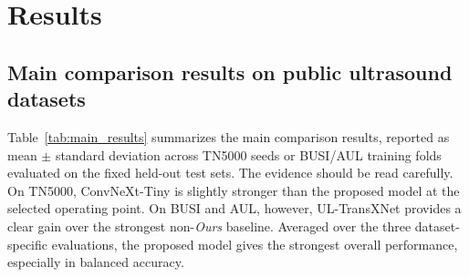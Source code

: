 \section{Results}
\label{sec:results}

\subsection{Main comparison results on public ultrasound datasets}
Table~\ref{tab:main_results} summarizes the main comparison results, reported as mean $\pm$ standard deviation across TN5000 seeds or BUSI/AUL training folds evaluated on the fixed held-out test sets. The evidence should be read carefully. On TN5000, ConvNeXt-Tiny is slightly stronger than the proposed model at the selected operating point. On BUSI and AUL, however, UL-TransXNet provides a clear gain over the strongest non-\textit{Ours} baseline. Averaged over the three dataset-specific evaluations, the proposed model gives the strongest overall performance, especially in balanced accuracy.

\begin{table}[t]
    \centering
    \small
    \caption{Main comparison results on the public ultrasound datasets. For each dataset, the table reports the proposed model and the strongest non-\textit{Ours} baseline ranked by mean test AUC. F1 denotes macro F1.}
    \label{tab:main_results}
\end{table}

